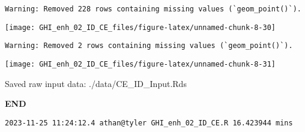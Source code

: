 \documentclass[
  10pt,
  a4paper,oneside]{article}
\begin{document}
\begin{verbatim}
Warning: Removed 228 rows containing missing values (`geom_point()`).
\end{verbatim}

\begin{center}\texttt{[image: GHI\_enh\_02\_ID\_CE\_files/figure-latex/unnamed-chunk-8-30]} \end{center}

\begin{verbatim}
Warning: Removed 2 rows containing missing values (`geom_point()`).
\end{verbatim}

\begin{center}\texttt{[image: GHI\_enh\_02\_ID\_CE\_files/figure-latex/unnamed-chunk-8-31]} \end{center}

Saved raw input data: ./data/CE\_ID\_Input.Rds

\textbf{END}

\begin{verbatim}
2023-11-25 11:24:12.4 athan@tyler GHI_enh_02_ID_CE.R 16.423944 mins
\end{verbatim}
\end{document}
